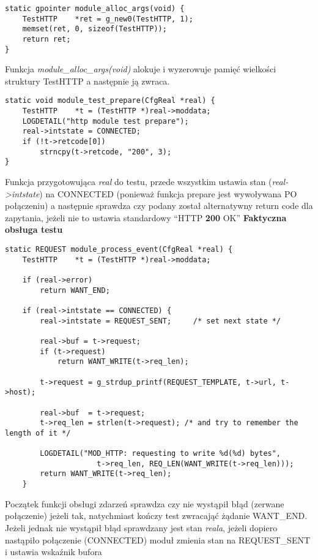 \documentclass[polish,12pt]{article}
\begin{document}
\begin{verbatim}
static gpointer module_alloc_args(void) {
    TestHTTP    *ret = g_new0(TestHTTP, 1);
    memset(ret, 0, sizeof(TestHTTP));
    return ret;
}
\end{verbatim}
Funkcja \textit{module\_alloc\_args(void)} alokuje i wyzerowuje pamięć wielkości struktury TestHTTP
a następnie ją zwraca.
\newline
\newline
\begin{verbatim}
static void module_test_prepare(CfgReal *real) {
    TestHTTP    *t = (TestHTTP *)real->moddata;
    LOGDETAIL("http module test prepare");
    real->intstate = CONNECTED;
    if (!t->retcode[0])
        strncpy(t->retcode, "200", 3);
}
\end{verbatim}
Funkcja przygotowująca \textit{real} do testu, przede wszystkim ustawia stan (\textit{real->intstate})
na CONNECTED (ponieważ funkcja prepare jest wywoływana PO połączeniu) a następnie sprawdza czy podany
został alternatywny return code dla zapytania, jeżeli nie to ustawia standardowy ``HTTP \textbf{200} OK''
\newpage
\large \textbf{Faktyczna obsługa testu}\newline
\normalsize
{\small
\begin{verbatim}
static REQUEST module_process_event(CfgReal *real) {
    TestHTTP    *t = (TestHTTP *)real->moddata;

    if (real->error)
        return WANT_END;

    if (real->intstate == CONNECTED) {
        real->intstate = REQUEST_SENT;     /* set next state */

        real->buf = t->request;
        if (t->request)
            return WANT_WRITE(t->req_len);

        t->request = g_strdup_printf(REQUEST_TEMPLATE, t->url, t->host);

        real->buf  = t->request;
        t->req_len = strlen(t->request); /* and try to remember the length of it */

        LOGDETAIL("MOD_HTTP: requesting to write %d(%d) bytes",
                     t->req_len, REQ_LEN(WANT_WRITE(t->req_len)));
        return WANT_WRITE(t->req_len);
    }
\end{verbatim}
}
Początek funkcji obsługi zdarzeń sprawdza czy nie wystąpił błąd (zerwane połączenie) jeżeli tak, natychmiast
kończy test zwracająć żądanie WANT\_END.
\newline
Jeżeli jednak nie wystąpił błąd sprawdzany jest stan \textit{reala},
jeżeli dopiero nastąpiło połączenie (CONNECTED) moduł zmienia stan na REQUEST\_SENT i ustawia wskaźnik bufora
\end{document}
